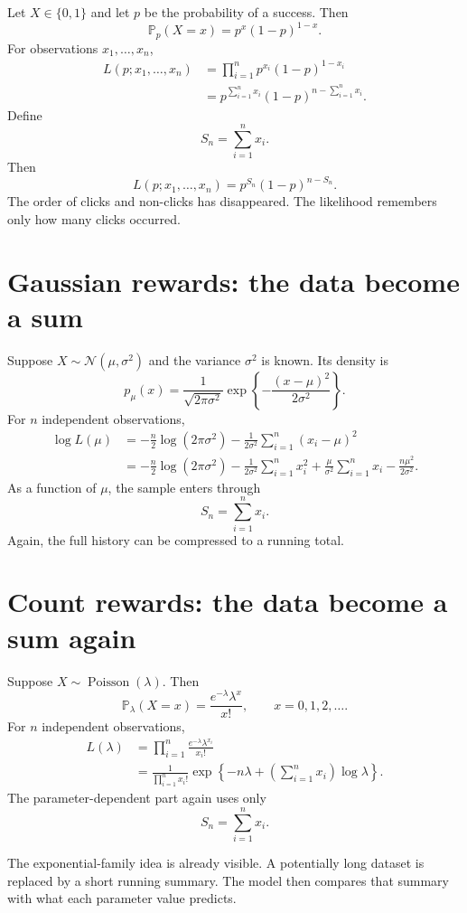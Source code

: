 \documentclass[en,nofont,11pt]{elegantbook}
\newcommand{\Pbb}{\mathbb{P}}
\newcommand{\Poi}{\operatorname{Poisson}}
\newcommand{\Normal}{\mathcal{N}}
\begin{document}
Let $X\in\{0,1\}$ and let $p$ be the probability of a success. Then
\[
\Pbb_p(X=x)=p^x(1-p)^{1-x}.
\]
For observations $x_1,\ldots,x_n$,
\begin{align*}
L(p;x_1,\ldots,x_n)
&=\prod_{i=1}^{n}p^{x_i}(1-p)^{1-x_i}\\
&=p^{\sum_{i=1}^{n}x_i}(1-p)^{n-\sum_{i=1}^{n}x_i}.
\end{align*}
Define
\[
S_n=\sum_{i=1}^{n}x_i.
\]
Then
\[
L(p;x_1,\ldots,x_n)=p^{S_n}(1-p)^{n-S_n}.
\]
The order of clicks and non-clicks has disappeared. The likelihood remembers only how many clicks occurred.

\section{Gaussian rewards: the data become a sum}

Suppose $X\sim\Normal(\mu,\sigma^2)$ and the variance $\sigma^2$ is known. Its density is
\[
p_\mu(x)
=
\frac{1}{\sqrt{2\pi\sigma^2}}
\exp\left\{-\frac{(x-\mu)^2}{2\sigma^2}\right\}.
\]
For $n$ independent observations,
\begin{align*}
\log L(\mu)
&=
-\frac{n}{2}\log(2\pi\sigma^2)
-\frac{1}{2\sigma^2}\sum_{i=1}^{n}(x_i-\mu)^2\\
&=
-\frac{n}{2}\log(2\pi\sigma^2)
-\frac{1}{2\sigma^2}\sum_{i=1}^{n}x_i^2
+\frac{\mu}{\sigma^2}\sum_{i=1}^{n}x_i
-\frac{n\mu^2}{2\sigma^2}.
\end{align*}
As a function of $\mu$, the sample enters through
\[
S_n=\sum_{i=1}^{n}x_i.
\]
Again, the full history can be compressed to a running total.

\section{Count rewards: the data become a sum again}

Suppose $X\sim\Poi(\lambda)$. Then
\[
\Pbb_\lambda(X=x)
=
\frac{e^{-\lambda}\lambda^x}{x!},
\qquad x=0,1,2,\ldots.
\]
For $n$ independent observations,
\begin{align*}
L(\lambda)
&=\prod_{i=1}^{n}\frac{e^{-\lambda}\lambda^{x_i}}{x_i!}\\
&=\frac{1}{\prod_{i=1}^{n}x_i!}
\exp\left\{-n\lambda+\left(\sum_{i=1}^{n}x_i\right)\log\lambda\right\}.
\end{align*}
The parameter-dependent part again uses only
\[
S_n=\sum_{i=1}^{n}x_i.
\]

\begin{keyidea}
The exponential-family idea is already visible. A potentially long dataset is replaced by a short running summary. The model then compares that summary with what each parameter value predicts.
\end{keyidea}
\end{document}
